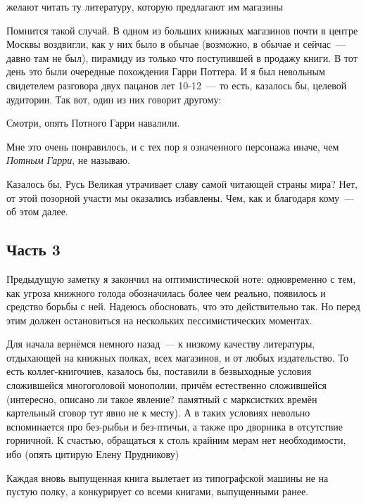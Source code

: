 \begin{shadequote}{}
 желают читать ту литературу, которую предлагают им магазины
\end{shadequote}

Помнится такой случай. В одном из больших книжных магазинов почти в центре Москвы воздвигли, как у них было в обычае (возможно, в обычае и сейчас~--- давно там не был), пирамиду из только что поступившей в продажу книги. В тот день это были очередные похождения Гарри Поттера. И я был невольным свидетелем разговора двух пацанов лет 10-12~--- то есть, казалось бы, целевой аудитории. Так вот, один из них говорит другому:


\begin{shadequote}{}
Смотри, опять Потного Гарри навалили.
\end{shadequote}

Мне это очень понравилось, и с тех пор я означенного персонажа иначе, чем 
\textit{Потным Гарри}, не называю.

Казалось бы, Русь Великая утрачивает славу самой читающей страны мира? Нет, от этой позорной участи мы оказались избавлены. Чем, как и благодаря кому~--- об этом далее.

\subsection{Часть 3}
Предыдущую заметку я закончил на оптимистической ноте: одновременно с тем, как угроза книжного голода обозначилась более чем реально, появилось и средство борьбы с ней. Надеюсь обосновать, что это действительно так. Но перед этим должен остановиться на нескольких пессимистических моментах.

Для начала вернёмся немного назад~--- к низкому качеству литературы, отдыхающей на книжных полках, всех магазинов, и от любых издательство. То есть коллег-книгочиев, казалось бы, поставили в безвыходные условия сложившейся многоголовой монополии, причём естественно сложившейся (интересно, описано ли такое явление? памятный с марксистких времён картельный сговор тут явно не к месту). А в таких условиях невольно вспоминается про без-рыбьи и без-птичьи, а также про дворника в отсутствие горничной. К счастью, обращаться к столь крайним мерам нет необходимости, ибо (опять цитирую Елену Прудникову)


\begin{shadequote}{}
Каждая вновь выпущенная книга вылетает из типографской машины не на пустую полку, а конкурирует со всеми книгами, выпущенными ранее.
\end{shadequote}


